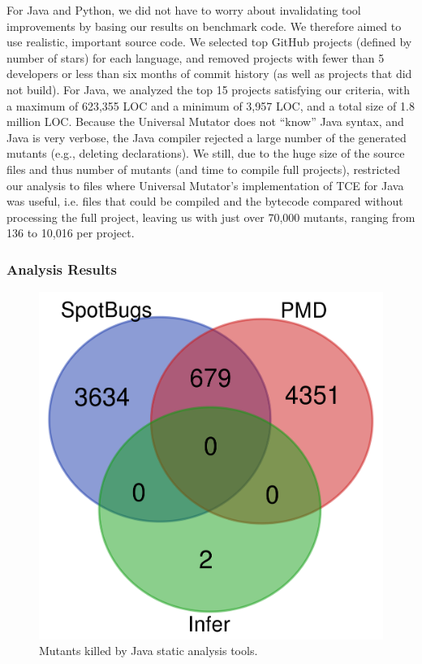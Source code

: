 For Java and Python, we did not have to worry about invalidating tool improvements by basing our results on benchmark code.  We therefore aimed to use realistic, important source code.  We selected top GitHub projects (defined by number of stars) for each language, and removed projects with fewer than 5 developers or less than six months of commit history (as well as projects that did not build).  For Java, we analyzed the top 15 projects satisfying our criteria, with a maximum of 623,355 LOC and a minimum of 3,957 LOC, and a total size of 1.8 million LOC.  Because the Universal Mutator does not ``know'' Java syntax, and Java is very verbose, the Java compiler rejected a large number of the generated mutants (e.g., deleting declarations).  We still, due to the huge size of the source files and thus number of mutants (and time to compile full projects), restricted our analysis to files where Universal Mutator's implementation of TCE \cite{TCE} for Java was useful, i.e. files that could be compiled and the bytecode compared without processing the full project, leaving us with just over 70,000 mutants, ranging from 136 to 10,016 per project.

\subsubsection{Analysis Results}


\begin{figure}
  \includegraphics[width=0.4\columnwidth]{java.png}
  \caption{Mutants killed by Java static analysis tools.}
  \label{fig:javavenn}
\end{figure}

